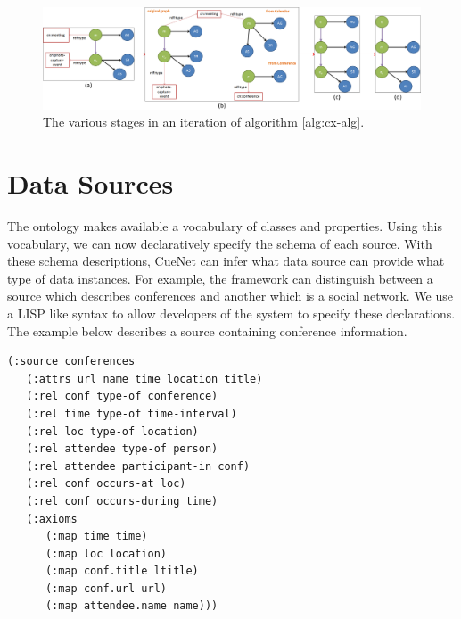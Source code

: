 \begin{figure}[t]
\centering
\includegraphics[width=\textwidth]{media/exec/exec-cycle-one-line.png}
\caption{The various stages in an iteration of algorithm \ref{alg:cx-alg}.}
\label{fig:exec-cycle}
\end{figure}

\section{Data Sources}
\label{sec:data-sources}
The ontology makes available a vocabulary of classes and properties. Using this vocabulary, we can now declaratively specify the schema of each source. With these schema descriptions, CueNet can infer what data source can provide what type of data instances. For example, the framework can distinguish between a source which describes conferences and another which is a social network. We use a LISP like syntax to allow developers of the system to specify these declarations. The example below describes a source containing conference information.

\begin{verbatim}
(:source conferences
   (:attrs url name time location title)
   (:rel conf type-of conference)
   (:rel time type-of time-interval)
   (:rel loc type-of location)
   (:rel attendee type-of person)
   (:rel attendee participant-in conf)
   (:rel conf occurs-at loc)
   (:rel conf occurs-during time)
   (:axioms
      (:map time time)
      (:map loc location)
      (:map conf.title ltitle)
      (:map conf.url url)
      (:map attendee.name name)))
\end{verbatim}


